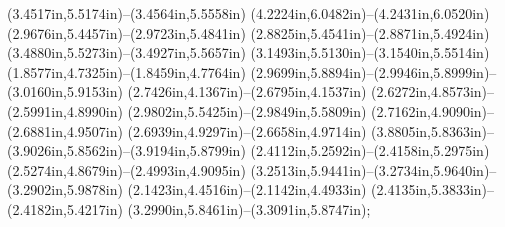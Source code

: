 (3.4517in,5.5174in)--(3.4564in,5.5558in) (4.2224in,6.0482in)--(4.2431in,6.0520in) (2.9676in,5.4457in)--(2.9723in,5.4841in) (2.8825in,5.4541in)--(2.8871in,5.4924in) (3.4880in,5.5273in)--(3.4927in,5.5657in) (3.1493in,5.5130in)--(3.1540in,5.5514in) (1.8577in,4.7325in)--(1.8459in,4.7764in) (2.9699in,5.8894in)--(2.9946in,5.8999in)--(3.0160in,5.9153in) (2.7426in,4.1367in)--(2.6795in,4.1537in) (2.6272in,4.8573in)--(2.5991in,4.8990in) (2.9802in,5.5425in)--(2.9849in,5.5809in) (2.7162in,4.9090in)--(2.6881in,4.9507in) (2.6939in,4.9297in)--(2.6658in,4.9714in) (3.8805in,5.8363in)--(3.9026in,5.8562in)--(3.9194in,5.8799in) (2.4112in,5.2592in)--(2.4158in,5.2975in) (2.5274in,4.8679in)--(2.4993in,4.9095in) (3.2513in,5.9441in)--(3.2734in,5.9640in)--(3.2902in,5.9878in) (2.1423in,4.4516in)--(2.1142in,4.4933in) (2.4135in,5.3833in)--(2.4182in,5.4217in) (3.2990in,5.8461in)--(3.3091in,5.8747in);
